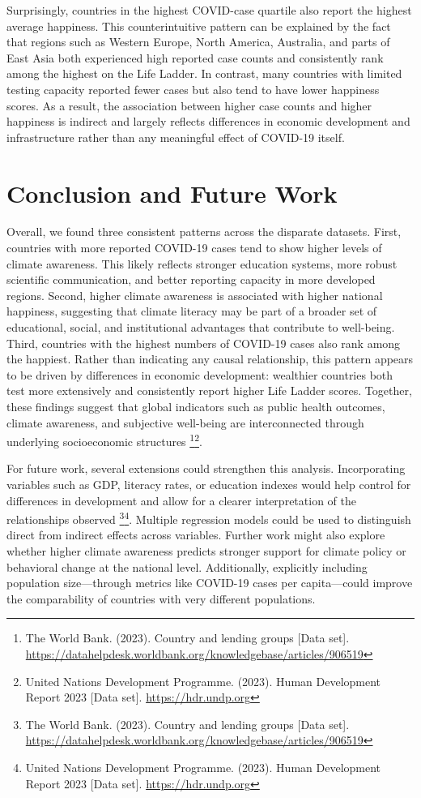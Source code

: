 \documentclass[
]{article}
\begin{document}
Surprisingly, countries in the highest COVID-case quartile also report the highest average happiness. This counterintuitive pattern can be explained by the fact that regions such as Western Europe, North America, Australia, and parts of East Asia both experienced high reported case counts and consistently rank among the highest on the Life Ladder. In contrast, many countries with limited testing capacity reported fewer cases but also tend to have lower happiness scores. As a result, the association between higher case counts and higher happiness is indirect and largely reflects differences in economic development and infrastructure rather than any meaningful effect of COVID-19 itself.

\section{Conclusion and Future Work}\label{conclusion-and-future-work}

Overall, we found three consistent patterns across the disparate datasets. First, countries with more reported COVID-19 cases tend to show higher levels of climate awareness. This likely reflects stronger education systems, more robust scientific communication, and better reporting capacity in more developed regions. Second, higher climate awareness is associated with higher national happiness, suggesting that climate literacy may be part of a broader set of educational, social, and institutional advantages that contribute to well-being. Third, countries with the highest numbers of COVID-19 cases also rank among the happiest. Rather than indicating any causal relationship, this pattern appears to be driven by differences in economic development: wealthier countries both test more extensively and consistently report higher Life Ladder scores. Together, these findings suggest that global indicators such as public health outcomes, climate awareness, and subjective well-being are interconnected through underlying socioeconomic structures \footnote{The World Bank. (2023). Country and lending groups {[}Data set{]}. \url{https://datahelpdesk.worldbank.org/knowledgebase/articles/906519}}\footnote{United Nations Development Programme. (2023). Human Development Report 2023 {[}Data set{]}. \url{https://hdr.undp.org}}.

For future work, several extensions could strengthen this analysis. Incorporating variables such as GDP, literacy rates, or education indexes would help control for differences in development and allow for a clearer interpretation of the relationships observed \footnote{The World Bank. (2023). Country and lending groups {[}Data set{]}. \url{https://datahelpdesk.worldbank.org/knowledgebase/articles/906519}}\footnote{United Nations Development Programme. (2023). Human Development Report 2023 {[}Data set{]}. \url{https://hdr.undp.org}}. Multiple regression models could be used to distinguish direct from indirect effects across variables. Further work might also explore whether higher climate awareness predicts stronger support for climate policy or behavioral change at the national level. Additionally, explicitly including population size---through metrics like COVID-19 cases per capita---could improve the comparability of countries with very different populations.
\end{document}

